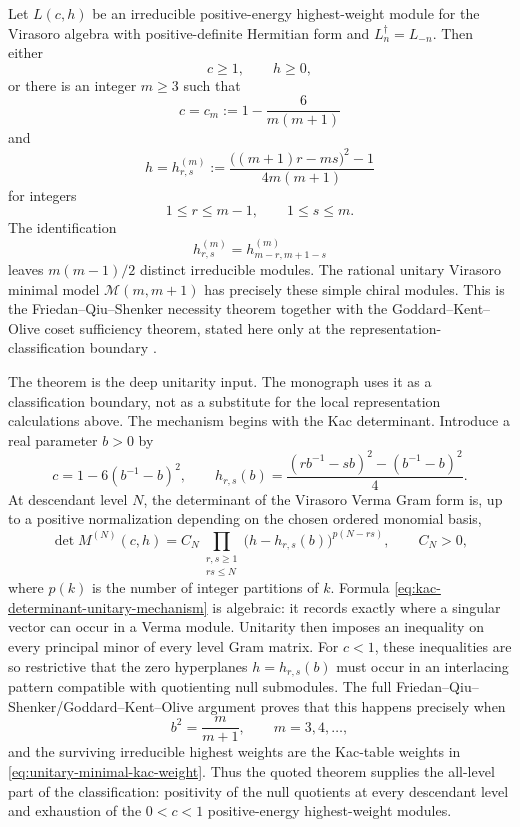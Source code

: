 \begin{quotedtheorem}
\label{qthm:unitary-virasoro-minimal-classification}
Let \(L(c,h)\) be an irreducible positive-energy highest-weight module for the
Virasoro algebra with positive-definite Hermitian form and
\(L_n^\dagger=L_{-n}\).  Then either
\[
  c\ge1,\qquad h\ge0,
\]
or there is an integer \(m\ge3\) such that
\begin{equation}
  c=c_m:=1-\frac{6}{m(m+1)}
  \label{eq:unitary-minimal-central-charge}
\end{equation}
and
\begin{equation}
  h=h_{r,s}^{(m)}
  :=
  \frac{\bigl((m+1)r-ms\bigr)^2-1}{4m(m+1)}
  \label{eq:unitary-minimal-kac-weight}
\end{equation}
for integers
\[
  1\le r\le m-1,\qquad 1\le s\le m.
\]
The identification
\begin{equation}
  h_{r,s}^{(m)}=h_{m-r,m+1-s}^{(m)}
  \label{eq:kac-table-identification}
\end{equation}
leaves \(m(m-1)/2\) distinct irreducible modules.  The rational unitary
Virasoro minimal model \(\mathcal M(m,m+1)\) has precisely these simple
chiral modules.  This is the Friedan--Qiu--Shenker necessity theorem together
with the Goddard--Kent--Olive coset sufficiency theorem, stated here only at
the representation-classification boundary \cite{FriedanQiuShenker1984,
GoddardKentOlive1986}.
\end{quotedtheorem}

The theorem is the deep unitarity input.  The monograph uses it as a
classification boundary, not as a substitute for the local representation
calculations above.  The mechanism begins with the Kac determinant.  Introduce
a real parameter \(b>0\) by
\[
  c=1-6(b^{-1}-b)^2,
  \qquad
  h_{r,s}(b)
  =
  \frac{(r b^{-1}-s b)^2-(b^{-1}-b)^2}{4}.
\]
At descendant level \(N\), the determinant of the Virasoro Verma Gram form is,
up to a positive normalization depending on the chosen ordered monomial basis,
\begin{equation}
  \det M^{(N)}(c,h)
  =
  C_N
  \prod_{\substack{r,s\ge1\\rs\le N}}
  \bigl(h-h_{r,s}(b)\bigr)^{p(N-rs)},
  \qquad
  C_N>0,
  \label{eq:kac-determinant-unitary-mechanism}
\end{equation}
where \(p(k)\) is the number of integer partitions of \(k\).  Formula
\eqref{eq:kac-determinant-unitary-mechanism} is algebraic: it records exactly
where a singular vector can occur in a Verma module.  Unitarity then imposes an
inequality on every principal minor of every level Gram matrix.  For \(c<1\),
these inequalities are so restrictive that the zero hyperplanes
\(h=h_{r,s}(b)\) must occur in an interlacing pattern compatible with
quotienting null submodules.  The full Friedan--Qiu--Shenker/Goddard--Kent--Olive
argument proves that this happens precisely when
\[
  b^2=\frac{m}{m+1},
  \qquad
  m=3,4,\ldots,
\]
and the surviving irreducible highest weights are the Kac-table weights in
\eqref{eq:unitary-minimal-kac-weight}.  Thus the quoted theorem supplies the
all-level part of the classification: positivity of the null quotients at
every descendant level and exhaustion of the \(0<c<1\) positive-energy
highest-weight modules.

